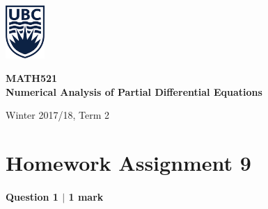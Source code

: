 

\usepackage{amsfonts,amsmath,amssymb,braket,xcolor,enumerate,graphicx}
\usepackage[hidelinks]{hyperref}
\usepackage{listings,multicol,mathtools,textcomp,tikz,pgfplots,wrapfig}
\usepackage{tabularx}
\usepackage{booktabs}
\usetikzlibrary{arrows}

\pagestyle{empty}
\setlength{\parindent}{0pt}
\setlength{\parskip}{6pt}




\begin{minipage}{.2\textwidth}
\includegraphics[width=42pt]{ubc-logo.png}
\end{minipage}
\hfill
\begin{minipage}{.75\textwidth}
\setlength{\parskip}{6pt}
\begin{flushright}
{\sffamily
\textbf{MATH521}\\
\textbf{Numerical Analysis of Partial Differential Equations}

Winter 2017/18, Term 2\\
}
\end{flushright}
\end{minipage}

\section*{Homework Assignment 9}


\paragraph*{Question 1 $\vert$ 1 mark}%

